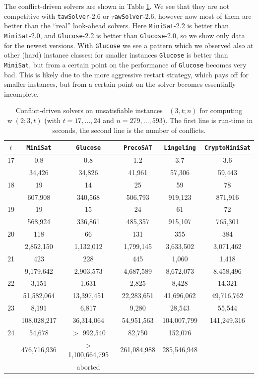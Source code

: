\documentclass[final,3p,times]{elsarticle}
\theoremstyle{definition}
\newcommand{\tawsolver}{\texttt{tawSolver}}
\newcommand{\ntawsolver}{\tawsolver-2.6}
\newcommand{\ttawsolver}{$\tau$\texttt{awSolver}-2.6}
\newcommand{\minisat}{\texttt{MiniSat}}
\newcommand{\cryptomini}{\texttt{CryptoMiniSat}}
\newcommand{\glucose}{\texttt{Glucose}}
\newcommand{\precosat}{\texttt{PrecoSAT}}
\newcommand{\lingeling}{\texttt{Lingeling}}
\DeclareMathOperator{\vdw}{w}
\DeclareMathOperator{\Fpd}{\mathit{F}^{pd}}
\begin{document}
The conflict-driven solvers are shown in Table \ref{tab:pdvdwcdsolvers}. We see that they are not competitive with \ntawsolver{} or \ttawsolver, however now most of them are better than the ``real'' look-ahead solvers. Here \minisat-2.2 is better than \minisat-2.0, and \glucose-2.2 is better than \glucose-2.0, so we show only data for the newest versions. With \glucose{} we see a pattern which we observed also at other (hard) instance classes: for smaller instances \glucose{} is better than \minisat{}, but from a certain point on the performance of \glucose{} becomes very bad. This is likely due to the more aggressive restart strategy, which pays off for smaller instances, but from a certain point on the solver becomes essentially incomplete.

\begin{table}[H]
  \centering
  \begin{tabular}{c||c|c|c|c|c}
    $t$ & \minisat & \glucose & \precosat & \lingeling & \cryptomini\\
    \hline\hline
    17 & 0.8 & 0.8 & 1.2 & 3.7 & 3.6\\
    & 34,426 & 34,826 & 41,961 & 57,306 & 59,443\\
    \hline
    18 & 19 & 14 & 25 & 59 & 78\\
    & 607,908 & 340,568 & 506,793 & 919,123 & 871,916\\
    \hline
    19 & 19 & 15 & 24 & 61 & 72\\
    & 568,924 & 336,861 & 485,357 & 915,107 & 765,301\\
    \hline
    20 & 118 & 66 & 131 & 355 & 384\\
    & 2,852,150 & 1,132,012 & 1,799,145 & 3,633,502 & 3,071,462\\
    \hline
    21 & 423 & 228 & 445 & 1,060 & 1,418\\
    & 9,179,642 & 2,903,573 & 4,687,589 & 8,672,073 & 8,458,496\\
    \hline
    22 & 3,151 & 1,631 & 2,825 & 8,428 & 14,321\\
    & 51,582,064 & 13,397,451 & 22,283,651 & 41,696,062 & 49,716,762\\
    \hline
    23 & 8,191 & 6,817 & 9,280 & 28,543 & 55,544\\
    & 108,028,217 & 36,314,064 & 54,951,563 & 104,007,799 & 141,249,316\\
    \hline
    24 & 54,678 & $>$ 992,540 & 82,750 & 152,076\\
    & 476,716,936 & $>$ 1,100,664,795 & 261,084,988 & 285,546,948 & \\
    && aborted
  \end{tabular}
  \caption{Conflict-driven solvers on unsatisfiable instances $\Fpd(3,t;n)$ for computing $\vdw(2;3,t)$ (with $t=17,\dots,24$ and $n=279, \dots, 593$). The first line is run-time in seconds, the second line is the number of conflicts.}
  \label{tab:pdvdwcdsolvers}
\end{table}
\end{document}
